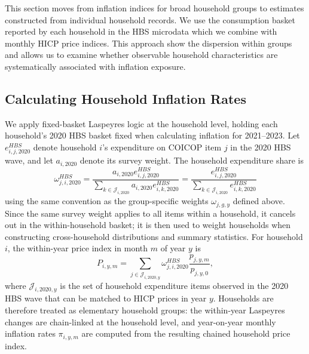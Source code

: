 \documentclass[11pt]{article}
\begin{document}
This section moves from inflation indices for broad household groups to estimates constructed from
individual household records. We use the consumption basket reported by each household in the HBS
microdata which we combine with monthly HICP
price indices. This approach show the dispersion within groups and allows us to
examine whether observable household characteristics are systematically associated with inflation
exposure.


\subsection{Calculating Household Inflation Rates}

We apply fixed-basket Laspeyres logic at the household level, holding each household's 2020 HBS
basket fixed when calculating inflation for 2021--2023. Let $e^{HBS}_{i,j,2020}$
denote household $i$'s expenditure on COICOP item $j$ in the 2020 HBS wave, and let $a_{i,2020}$ denote
its survey weight. The household expenditure share is
\begin{equation}
\omega^{HBS}_{j,i,2020}
=
\frac{a_{i,2020}e^{HBS}_{i,j,2020}}{\sum_{k \in \mathcal{J}_{i,2020}} a_{i,2020}e^{HBS}_{i,k,2020}}
=
\frac{e^{HBS}_{i,j,2020}}{\sum_{k \in \mathcal{J}_{i,2020}} e^{HBS}_{i,k,2020}}
\end{equation}
using the same convention as the group-specific weights $\omega_{j,g,y}$ defined above. Since the
same survey weight applies to all items within a household, it cancels out in the within-household
basket; it is then used to weight households when constructing cross-household distributions and
summary statistics. For household $i$, the within-year price index in month $m$ of year $y$ is
\begin{equation}
P_{i,y,m}
=
\sum_{j \in \mathcal{J}_{i,2020,y}}
\omega^{HBS}_{j,i,2020}
\frac{p_{j,y,m}}{p_{j,y,0}}
,
\end{equation}
where $\mathcal{J}_{i,2020,y}$ is the set of household expenditure items observed in the 2020 HBS wave
that can be matched to HICP prices in year $y$. Households are therefore treated as elementary
household groups: the within-year Laspeyres changes are chain-linked at the household level, and
year-on-year monthly inflation rates $\pi_{i,y,m}$ are computed from the resulting chained household
price index.
\end{document}
